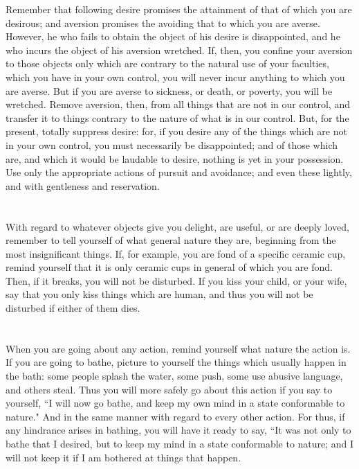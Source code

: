 \documentclass[12pt]{article}
\begin{document}
Remember that following desire promises the attainment of that
of which you are desirous; and aversion promises the avoiding that
to which you are averse. However, he who fails to obtain the object
of his desire is disappointed, and he who incurs the object of his
aversion wretched. If, then, you confine your aversion to those objects
only which are contrary to the natural use of your faculties, which
you have in your own control, you will never incur anything to which
you are averse. But if you are averse to sickness, or death, or poverty,
you will be wretched. Remove aversion, then, from all things that
are not in our control, and transfer it to things contrary to the
nature of what is in our control. But, for the present, totally suppress
desire: for, if you desire any of the things which are not in your
own control, you must necessarily be disappointed; and of those which
are, and which it would be laudable to desire, nothing is yet in your
possession. Use only the appropriate actions of pursuit and avoidance;
and even these lightly, and with gentleness and reservation.

\section{}

With regard to whatever objects give you delight, are useful, or
are deeply loved, remember to tell yourself of what general nature
they are, beginning from the most insignificant things. If, for example,
you are fond of a specific ceramic cup, remind yourself that it is
only ceramic cups in general of which you are fond. Then, if it breaks,
you will not be disturbed. If you kiss your child, or your wife, say
that you only kiss things which are human, and thus you will not be
disturbed if either of them dies. 

\section{}

When you are going about any action, remind yourself what nature
the action is. If you are going to bathe, picture to yourself the
things which usually happen in the bath: some people splash the water,
some push, some use abusive language, and others steal. Thus you will
more safely go about this action if you say to yourself, ``I will now
go bathe, and keep my own mind in a state conformable to nature."
And in the same manner with regard to every other action. For thus,
if any hindrance arises in bathing, you will have it ready to say,
``It was not only to bathe that I desired, but to keep my mind in a
state conformable to nature; and I will not keep it if I am bothered
at things that happen. 
\end{document}
